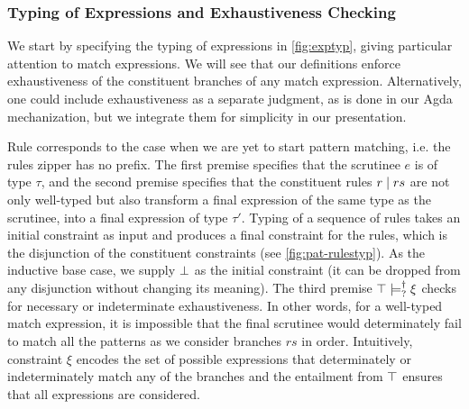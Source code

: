 \subsubsection{Typing of Expressions and Exhaustiveness Checking} \label{sec:exptyp}

We start by specifying the typing of expressions in \autoref{fig:exptyp}, giving particular attention to match expressions. We will see that our definitions enforce exhaustiveness of the constituent branches of any match expression. Alternatively, one could include exhaustiveness as a separate judgment, as is done in our Agda mechanization, but we integrate them for simplicity in our presentation.

Rule \TMatchZPre corresponds to the case when we are yet to start pattern
matching, i.e. the rules zipper has no prefix. The first premise specifies that the scrutinee $e$ is of type $\tau$,
and the second premise specifies that the constituent rules $r \mid rs$ are not only
well-typed but also transform a final expression of the same type as the
scrutinee, into a final expression of type $\tau'$. 
Typing of a sequence of rules takes an initial constraint as input and produces a final constraint for the rules, 
which is the disjunction of the constituent constraints (see \autoref{fig:pat-rulestyp}). 
As the inductive base case, we supply $\bot$ as the initial constraint (it can be dropped from any disjunction without changing its meaning). 
The 
third premise $\top \models_{?}^{\dag} \xi$ checks for necessary or indeterminate exhaustiveness. 
In other words, for a well-typed match expression,
it is impossible that the final scrutinee would determinately fail to match all the patterns as we consider branches $rs$ in order.
Intuitively, constraint $\xi$ encodes the set of possible expressions that determinately or indeterminately match any of the branches and the entailment from $\top$ ensures that all expressions are considered.

